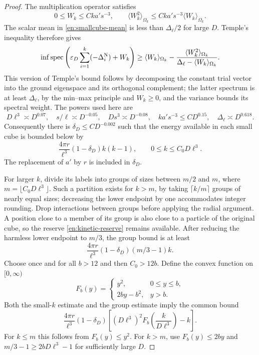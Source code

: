 \begin{proof}
The multiplication operator satisfies
\[
 0\le W_k\le Cka's^{-3},\qquad
 \langle W_k^2\rangle_{\Omega_k}
       \le Cka's^{-3}\langle W_k\rangle_{\Omega_k}.
\]
The scalar mean in \eqref{en:smallcube-mean} is less than
\(\Delta_\ell/2\) for large \(D\).  Temple's inequality therefore
gives
\begin{equation}\label{en:smallcube-temple}
 \inf\operatorname{spec}\left(
    \varepsilon_D\sum_{i=1}^k(-\Delta_i^{\mathrm N})+W_k\right)
 \ge \langle W_k\rangle_{\Omega_k}
   -\frac{\langle W_k^2\rangle_{\Omega_k}}
          {\Delta_\ell-\langle W_k\rangle_{\Omega_k}}.
\end{equation}
This version of Temple's bound follows by decomposing the constant
trial vector into the ground eigenspace and its orthogonal complement;
the latter spectrum is at least \(\Delta_\ell\), by the min--max
principle and \(W_k\ge0\), and the variance bounds its spectral weight.
The powers used here are
\[
 D\ell^3\asymp D^{0.07},\quad
 s/\ell\asymp D^{-0.05},\quad
 Ds^3\asymp D^{-0.08},\quad
 ka's^{-3}\le CD^{0.15},\quad
 \Delta_\ell\asymp D^{0.618}.
\]
Consequently there is \(\delta_D\le CD^{-0.002}\) such that
the energy available in each small cube is bounded below by
\begin{equation}\label{en:smallcube-quadratic}
   \frac{4\pi r}{\ell^3}(1-\delta_D)k(k-1),
       \qquad 0\le k\le C_0D\ell^3.
\end{equation}
The replacement of \(a'\) by \(r\) is included in \(\delta_D\).

For larger \(k\), divide its labels into groups of sizes between
\(m/2\) and \(m\), where \(m=\lfloor C_0D\ell^3\rfloor\).
Such a partition exists for \(k>m\), by taking
\(\lceil k/m\rceil\) groups of nearly equal sizes; decreasing the
lower endpoint by one accommodates integer rounding.  Drop interactions
between groups before applying the radial argument.  A position close
to a member of its group is also close to a particle of the original
cube, so the reserve \eqref{en:kinetic-reserve} remains available.
After reducing the harmless lower endpoint to \(m/3\), the group
bound is at least
\[
  \frac{4\pi r}{\ell^3}(1-\delta_D)(m/3-1)k.
\]
Choose once and for all \(b>12\) and then \(C_0>12b\).
Define the convex function on \([0,\infty)\)
\[
 F_b(y)=
 \begin{cases}
 y^2,&0\le y\le b,\\
 2by-b^2,&y>b.
 \end{cases}
\]
Both the small-\(k\) estimate and the group estimate imply the common
bound
\begin{equation}\label{en:smallcube-convex}
 \frac{4\pi r}{\ell^3}(1-\delta_D)
 \left[(D\ell^3)^2F_b\left(\frac{k}{D\ell^3}\right)-k\right].
\end{equation}
For \(k\le m\) this follows from \(F_b(y)\le y^2\).
For \(k>m\), use \(F_b(y)\le2by\) and
\(m/3-1\ge2bD\ell^3-1\) for sufficiently large \(D\).


\end{proof}
